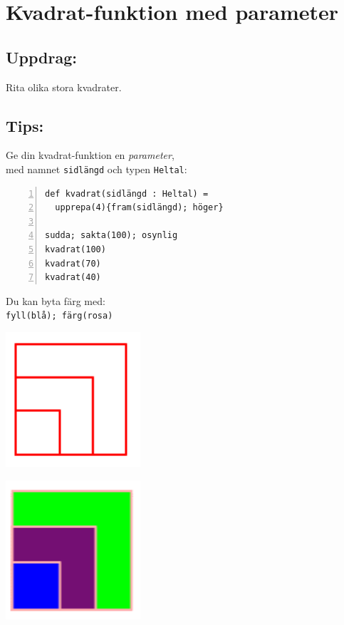 \chapter{Kvadrat-funktion med parameter}
\begin{multicols}{2}
\section*{\color{BrickRed}Uppdrag:}
Rita olika stora kvadrater.
\section*{\color{OliveGreen}Tips:}
Ge din kvadrat-funktion en {\it parameter},\\
med namnet \lstinline{sidlängd} och typen \lstinline{Heltal}:

\begin{lstlisting}[backgroundcolor=\color{gray!15}, numbers=left,basicstyle={\ttfamily\fontsize{16.0}{16.0}\selectfont}]
def kvadrat(sidlängd : Heltal) = 
  upprepa(4){fram(sidlängd); höger}

sudda; sakta(100); osynlig
kvadrat(100) 
kvadrat(70)
kvadrat(40)
\end{lstlisting}
        
Du kan byta färg med:\\
\lstinline{fyll(blå); färg(rosa)}


\columnbreak


\begin{center}
\includegraphics[width=5.0cm]{../img/square-param.png}
\end{center}

\begin{center}
\includegraphics[width=5.0cm]{../img/square-param-color.png}
\end{center}

\end{multicols}

